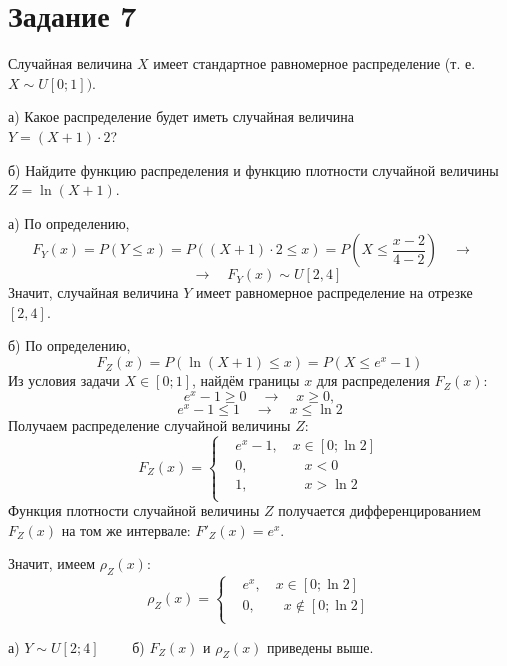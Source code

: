 \documentclass[a4paper,12pt]{article}
\newcommand{\ssolve}{\par\vspace{5pt}\noindent{\bf Решение. }\par}
\newcommand{\aanswer}{\par\vspace{5pt}\noindent{\bf Ответ. }}
\newcommand{\llaq}{\quad \longrightarrow \quad}
\begin{document}
\section*{Задание 7}
Случайная величина $X$ имеет стандартное равномерное распределение (т. е. $X \sim U[0; 1])$. \par
а) Какое распределение будет иметь случайная величина \\ $Y = (X + 1) \cdot 2$? \par
б) Найдите функцию распределения и функцию плотности случайной величины $Z = \ln(X + 1)$.
\ssolve
а) По определению,
$$F_Y(x) = P(Y \leq x) = P((X+1)\cdot 2 \leq x) = P(X \leq \frac{x-2}{4-2}) \llaq $$
$$\llaq F_Y(x) \sim U[2,4]$$
Значит, случайная величина $Y$ имеет равномерное распределение на отрезке $[2, 4]$. \par
\vspace{5pt}
б) По определению,
$$F_Z(x) = P(\ln(X+1) \leq x ) = P(X \leq e^x - 1)$$
Из условия задачи $X \in [0;1]$, найдём границы $x$ для распределения $F_Z(x)$:
$$e^x - 1 \geq 0 \llaq x \geq 0,$$
$$ e^x - 1 \leq 1 \llaq x \leq \ln 2$$
Получаем распределение случайной величины $Z$:
$$F_Z(x)=
\left\{
\begin{aligned}
& e^x - 1, \quad x \in [0; \ln 2] \\
& 0 , \qquad \qquad x < 0 \\
& 1 , \qquad \qquad x > \ln 2 \\
\end{aligned}
\right.$$
Функция плотности случайной величины $Z$ получается дифференцированием $F_Z(x)$ на том же интервале:
$F'_Z(x) = e^x$. \par
Значит, имеем $\rho_Z(x)$:
$$\rho_Z(x)=
\left\{
\begin{aligned}
& e^x , \quad x \in [0; \ln 2] \\
& 0 , \qquad x \notin [0; \ln 2] \\
\end{aligned}
\right.$$
\aanswer
а) $Y \sim U[2;4] \qquad$ б) $F_Z(x)$ и $\rho_Z(x)$ приведены выше.
\end{document}

